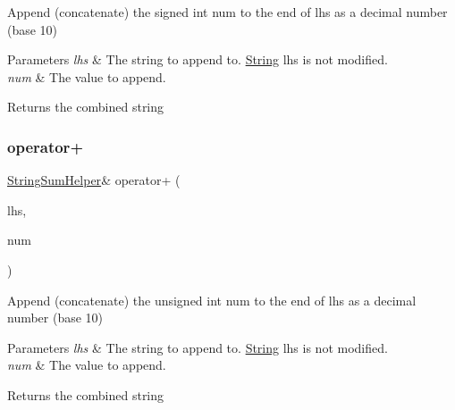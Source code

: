 Append (concatenate) the signed int num to the end of lhs as a decimal number (base 10) 


\begin{DoxyParams}{Parameters}
{\em lhs} & The string to append to. \hyperlink{class_string}{String} lhs is not modified.\\
\hline
{\em num} & The value to append.\\
\hline
\end{DoxyParams}
\begin{DoxyReturn}{Returns}
the combined string 
\end{DoxyReturn}
\mbox{\label{class_string_a20c7726a6ea2c053044c19f40e5c91aa}} 
\subsubsection{\texorpdfstring{operator+}{operator+}\hspace{0.1cm}{\footnotesize\ttfamily [6/10]}}
{\footnotesize\ttfamily \hyperlink{class_string_sum_helper}{String\+Sum\+Helper}\& operator+ (\begin{DoxyParamCaption}\item[{const \hyperlink{class_string_sum_helper}{String\+Sum\+Helper} \&}]{lhs,  }\item[{unsigned int}]{num }\end{DoxyParamCaption})\hspace{0.3cm}{\ttfamily [friend]}}



Append (concatenate) the unsigned int num to the end of lhs as a decimal number (base 10) 


\begin{DoxyParams}{Parameters}
{\em lhs} & The string to append to. \hyperlink{class_string}{String} lhs is not modified.\\
\hline
{\em num} & The value to append.\\
\hline
\end{DoxyParams}
\begin{DoxyReturn}{Returns}
the combined string 
\end{DoxyReturn}
\mbox{\label{class_string_a50aa43ee66fafd4a7e03c453a62aaac1}} 
